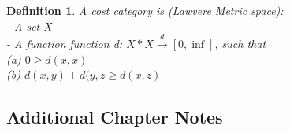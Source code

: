 \documentclass{article}
\newtheorem{defn}[thm]{Definition} %
\begin{document}
\begin{defn}
    A cost category is (Lawvere Metric space): \\
    - A set X \\
    - A function function d: $X*X \xrightarrow{d} [0, \inf]$, 
    such that \\
    (a) $0 \geq d(x, x)$ \\
    (b) $d(x, y) + d(y,z \geq d(x,z)$
\end{defn}
\subsection{Additional Chapter Notes}
\end{document}
